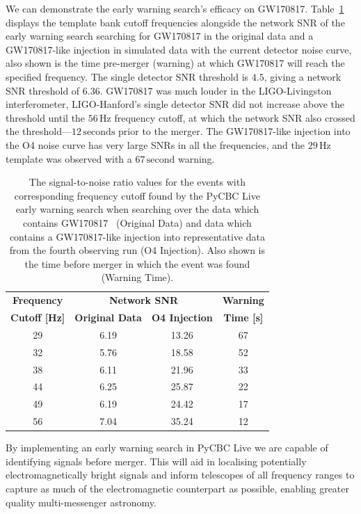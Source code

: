 We can demonstrate the early warning search's efficacy on GW170817. Table~\ref{6:tab:gw170817_early_warning} displays the template bank cutoff frequencies alongside the network SNR of the early warning search searching for GW170817 in the original data and a GW170817-like injection in simulated data with the current detector noise curve, also shown is the time pre-merger (warning) at which GW170817 will reach the specified frequency. The single detector SNR threshold is $4.5$, giving a network SNR threshold of $6.36$. GW170817 was much louder in the LIGO-Livingston interferometer, LIGO-Hanford's single detector SNR did not increase above the threshold until the $56 \, \text{Hz}$ frequency cutoff, at which the network SNR also crossed the threshold---$12 \, \text{seconds}$ prior to the merger. The GW170817-like injection into the O4 noise curve has very large SNRs in all the frequencies, and the $29 \, \text{Hz}$ template was observed with a $67 \, \text{second}$ warning.
%
\begin{table}[ht]
    \centering
    \setlength{\tabcolsep}{4pt}
    \begin{tabular}{cccc}
        \toprule
        \multicolumn{1}{c}{\textbf{Frequency}} & \multicolumn{2}{c}{\textbf{Network SNR}} & \multicolumn{1}{c}{\textbf{Warning}} \\
        \cmidrule(lr){1-4}
        \textbf{Cutoff [Hz]} & \textbf{Original Data} & \textbf{O4 Injection} & \textbf{Time [s]} \\
        \midrule
        29 & 6.19 & 13.26 & 67 \\
        32 & 5.76 & 18.58 & 52 \\
        38 & 6.11 & 21.96 & 33 \\
        44 & 6.25 & 25.87 & 22 \\
        49 & 6.19 & 24.42 & 17 \\
        56 & 7.04 & 35.24 & 12 \\
        \bottomrule
    \end{tabular}
    \caption{The signal-to-noise ratio values for the \gwadj events with corresponding frequency cutoff found by the PyCBC Live early warning search when searching over the data which contains GW170817~\cite{GW170817:2017} (Original Data) and data which contains a GW170817-like injection into representative data from the fourth observing run (O4 Injection). Also shown is the time before merger in which the event was found (Warning Time).}
    \label{6:tab:gw170817_early_warning}
\end{table}
%
By implementing an early warning search in PyCBC Live we are capable of identifying \gwadj signals before merger. This will aid in localising potentially electromagnetically bright \gwadj signals and inform telescopes of all frequency ranges to capture as much of the electromagnetic counterpart as possible, enabling greater quality multi-messenger astronomy.


